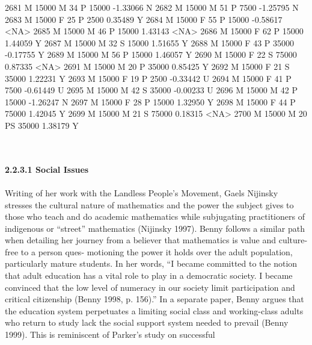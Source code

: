 \documentclass{article}
\begin{document}
\begin{Schunk}
\begin{Soutput}
2681      M      15000   M  34         P  15000  -1.33066    N
2682      M      15000   M  51         P   7500  -1.25795    N
2683      M      15000   F  25         P   2500   0.35489    Y
2684      M      15000   F  55         P  15000  -0.58617 <NA>
2685      M      15000   M  46         P  15000   1.43143 <NA>
2686      M      15000   F  62         P  15000   1.44059    Y
2687      M      15000   M  32         S  15000   1.51655    Y
2688      M      15000   F  43         P  35000  -0.17755    Y
2689      M      15000   M  56         P  15000   1.46057    Y
2690      M      15000   F  22         S  75000   0.87335 <NA>
2691      M      15000   M  20         P  35000   0.85425    Y
2692      M      15000   F  21         S  35000   1.22231    Y
2693      M      15000   F  19         P   2500  -0.33442    U
2694      M      15000   F  41         P   7500  -0.61449    U
2695      M      15000   M  42         S  35000  -0.00233    U
2696      M      15000   M  42         P  15000  -1.26247    N
2697      M      15000   F  28         P  15000   1.32950    Y
2698      M      15000   F  44         P  75000   1.42045    Y
2699      M      15000   M  21         S  75000   0.18315 <NA>
2700      M      15000   M  20        PS  35000   1.38179    Y
\end{Soutput}
\end{Schunk}
\textit{\\\\}
\textbf{ 2.2.3.1 Social Issues }
\textit{\\\\}
 Writing of her work with the Landless People’s Movement, Gaels Nijinsky stresses
 the cultural nature of mathematics and the power the subject gives to those who
 teach and do academic mathematics while subjugating practitioners of indigenous or
 “street” mathematics (Nijinsky 1997). Benny follows a similar path when detailing her
 journey from a believer that mathematics is value and culture-free to a person ques-
   motioning the power it holds over the adult population, particularly mature students. In
 her words, “I became committed to the notion that adult education has a vital role
 to play in a democratic society. I became convinced that the low level of numeracy
 in our society limit participation and critical citizenship (Benny 1998, p. 156).” In a
 separate paper, Benny argues that the education system perpetuates a limiting social
 class and working-class adults who return to study lack the social support system
 needed to prevail (Benny 1999). This is reminiscent of Parker’s study on successful
\end{document}
